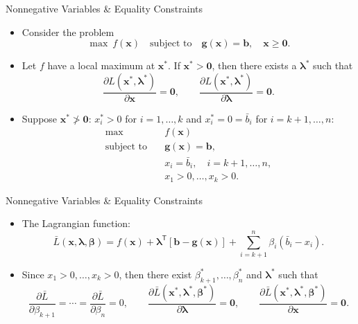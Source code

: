 \documentclass[aspectratio=169,hyperref,UTF8,CJK]{beamer}
\newcommand{\trans}{\mathsf{T}}
\newcommand{\vect}[1]{\boldsymbol{#1}}
\begin{document}
\begin{frame}{Nonnegative Variables \& Equality Constraints}
  \small
  \begin{itemize}
    \item Consider the problem
      \begin{equation*}
        \max\ f(\vect{x})\quad\text{subject to}\quad
        \vect{g}(\vect{x})=\vect{b},\quad\vect{x}\ge\vect{0}.
      \end{equation*}
    \item Let $f$ have a local maximum at $\vect{x}^{*}$. If $\vect{x}^{*}>\vect{0}$, then there exists a $\vect{\lambda}^{*}$ such that
      \begin{equation*}
        \frac{\partial L(\vect{x}^{*},\vect{\lambda}^{*})}{\partial\vect{x}}=\vect{0},
        \qquad
        \frac{\partial L(\vect{x}^{*},\vect{\lambda}^{*})}{\partial\vect{\lambda}}=\vect{0}.
      \end{equation*}
    \item Suppose $\vect{x}^{*}\not>\vect{0}$: $x_i^{*}>0$ for $i=1,\ldots,k$ and $x_i^{*}=0=\bar b_i$ for $i=k+1,\ldots,n$:
      \begin{align*}
        \max\quad &f(\vect{x})\\
        \text{subject to}\quad &\vect{g}(\vect{x})=\vect{b},\\
        &x_i=\bar b_i,\quad i=k+1,\ldots,n,\\
        &x_1>0,\ldots,x_k>0.
      \end{align*}
  \end{itemize}
\end{frame}

\begin{frame}{Nonnegative Variables \& Equality Constraints}
  \small
  \begin{itemize}
    \item The Lagrangian function:
      \begin{equation*}
        \bar L(\vect{x},\vect{\lambda},\vect{\beta})
        =f(\vect{x})+\vect{\lambda}^{\trans}[\vect{b}-\vect{g}(\vect{x})]
        +\sum_{i=k+1}^{n}\beta_i(\bar b_i-x_i).
      \end{equation*}
    \item Since $x_1>0,\ldots,x_k>0$, then there exist $\beta_{k+1}^{*},\ldots,\beta_n^{*}$ and $\vect{\lambda}^{*}$ such that
      \begin{equation*}
        \frac{\partial\bar L}{\partial\beta_{k+1}}=\cdots=
        \frac{\partial\bar L}{\partial\beta_n}=0,
        \qquad
        \frac{\partial\bar L(\vect{x}^{*},\vect{\lambda}^{*},\vect{\beta}^{*})}{\partial\vect{\lambda}}=\vect{0},
        \qquad
        \frac{\partial\bar L(\vect{x}^{*},\vect{\lambda}^{*},\vect{\beta}^{*})}{\partial\vect{x}}=\vect{0}.
      \end{equation*}
  \end{itemize}
\end{frame}
\end{document}
